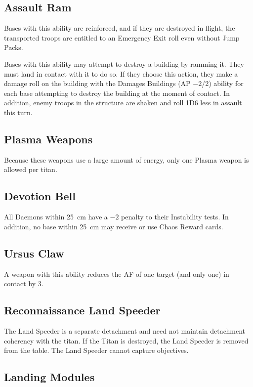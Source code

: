 \subsection{Assault Ram}

Bases with this ability are reinforced, and if they are destroyed in flight, the transported troops are entitled to an Emergency Exit roll even without Jump Packs.

Bases with this ability may attempt to destroy a building by ramming it. They must land in contact with it to do so. If they choose this action, they make a damage roll on the building with the Damages Buildings (AP $-2$/2) ability for each base attempting to destroy the building at the moment of contact. In addition, enemy troops in the structure are shaken and roll 1D6 less in assault this turn.

\subsection{Plasma Weapons}

Because these weapons use a large amount of energy, only one Plasma weapon is allowed per titan.

\subsection{Devotion Bell}

All Daemons within 25~cm have a $-2$ penalty to their Instability tests. In addition, no base within 25~cm may receive or use Chaos Reward cards.

\subsection{Ursus Claw}

A weapon with this ability reduces the AF of one target (and only one) in contact by 3.

\subsection{Reconnaissance Land Speeder}

The Land Speeder is a separate detachment and need not maintain detachment coherency with the titan. If the Titan is destroyed, the Land Speeder is removed from the table. The Land Speeder cannot capture objectives.

\subsection{Landing Modules}

